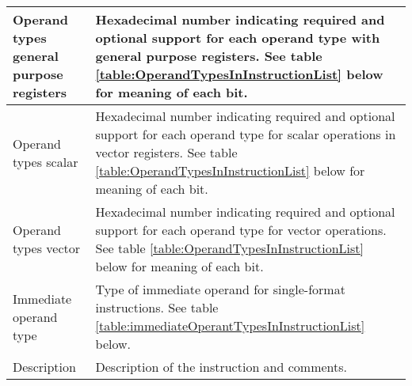\documentclass[forwardcom.tex]{subfiles}
\begin{document}
\begin{longtable} {|p{18mm}|p{100mm}|}
\hline
Operand types general purpose registers & Hexadecimal number indicating required and optional support for each operand type with general purpose registers. See table \ref{table:OperandTypesInInstructionList} below for meaning of each bit. \\
\hline
Operand types scalar & Hexadecimal number indicating required and optional support for each operand type for scalar operations in vector registers. See table \ref{table:OperandTypesInInstructionList} below for meaning of each bit. \\
\hline
Operand types vector & Hexadecimal number indicating required and optional support for each operand type for vector operations. See table \ref{table:OperandTypesInInstructionList} below for meaning of each bit. \\
\hline
Immediate operand type & Type of immediate operand for single-format instructions. See table \ref{table:immediateOperantTypesInInstructionList} below. \\
\hline
Description & Description of the instruction and comments. \\
\hline
\end{longtable}
\end{document}
